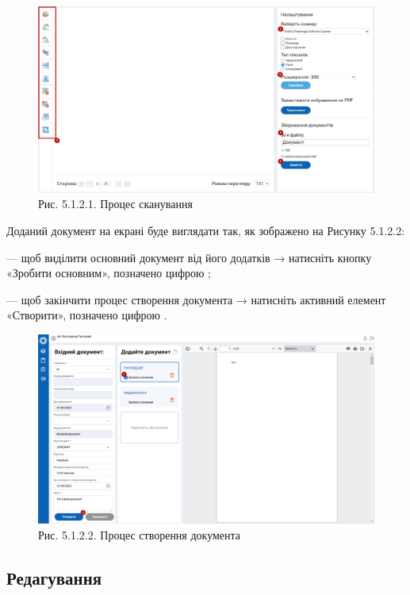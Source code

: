 \begin{figure}[!htbp]
\centerline{\includegraphics[width=\textwidth]{img/5.1.2.1.png}}
\caption{Рис. 5.1.2.1. Процес сканування}
\end{figure}

Доданий документ на екрані буде виглядати так, як зображено на Рисунку 5.1.2.2:

--- щоб виділити основний документ від його додатків → натисніть кнопку «Зробити основним», позначено цифрою ;

--- щоб закінчити процес створення документа → натисніть активний елемент «Створити», позначено цифрою .

\begin{figure}[!htbp]
\centerline{\includegraphics[width=\textwidth]{img/5.1.2.2.png}}
\caption{Рис. 5.1.2.2. Процес створення документа}
\end{figure}

\subsection{Редагування}


